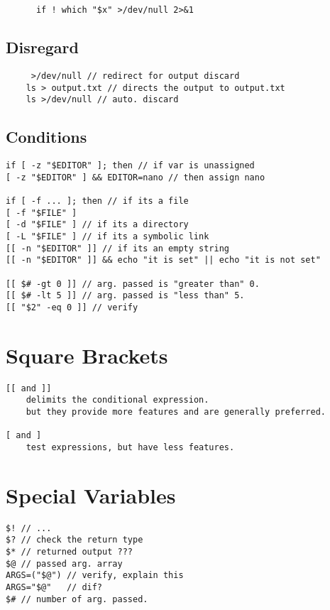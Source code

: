 \begin{verbatim}
      if ! which "$x" >/dev/null 2>&1
\end{verbatim}

\subsection{Disregard}

\begin{verbatim}
     >/dev/null // redirect for output discard
    ls > output.txt // directs the output to output.txt
    ls >/dev/null // auto. discard
\end{verbatim}

\subsection{Conditions}
\begin{verbatim}
if [ -z "$EDITOR" ]; then // if var is unassigned
[ -z "$EDITOR" ] && EDITOR=nano // then assign nano

if [ -f ... ]; then // if its a file
[ -f "$FILE" ] 
[ -d "$FILE" ] // if its a directory
[ -L "$FILE" ] // if its a symbolic link 
[[ -n "$EDITOR" ]] // if its an empty string
[[ -n "$EDITOR" ]] && echo "it is set" || echo "it is not set"

[[ $# -gt 0 ]] // arg. passed is "greater than" 0.
[[ $# -lt 5 ]] // arg. passed is "less than" 5.
[[ "$2" -eq 0 ]] // verify 
\end{verbatim}

\section{Square Brackets}

\begin{verbatim}
[[ and ]] 
    delimits the conditional expression. 
    but they provide more features and are generally preferred.

[ and ]
    test expressions, but have less features.
\end{verbatim}

\section{Special Variables}

\begin{verbatim}
$! // ... 
$? // check the return type
$* // returned output ???
$@ // passed arg. array 
ARGS=("$@") // verify, explain this
ARGS="$@"   // dif?
$# // number of arg. passed.
\end{verbatim}

